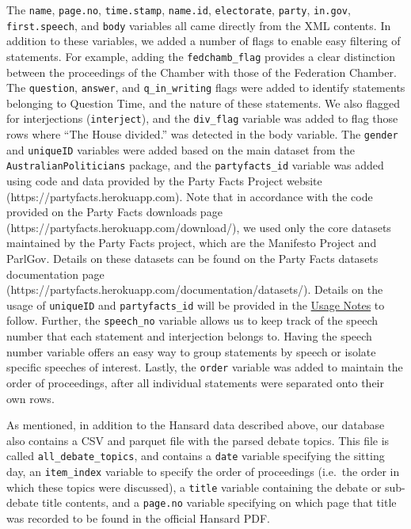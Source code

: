 \documentclass[
  letterpaper,
  DIV=11,
  numbers=noendperiod]{scrartcl}
\begin{document}
The \texttt{name}, \texttt{page.no}, \texttt{time.stamp},
\texttt{name.id}, \texttt{electorate}, \texttt{party}, \texttt{in.gov},
\texttt{first.speech}, and \texttt{body} variables all came directly
from the XML contents. In addition to these variables, we added a number
of flags to enable easy filtering of statements. For example, adding the
\texttt{fedchamb\_flag} provides a clear distinction between the
proceedings of the Chamber with those of the Federation Chamber. The
\texttt{question}, \texttt{answer}, and \texttt{q\_in\_writing} flags
were added to identify statements belonging to Question Time, and the
nature of these statements. We also flagged for interjections
(\texttt{interject}), and the \texttt{div\_flag} variable was added to
flag those rows where ``The House divided.'' was detected in the body
variable. The \texttt{gender} and \texttt{uniqueID} variables were added
based on the main dataset from the \texttt{AustralianPoliticians}
package, and the \texttt{partyfacts\_id} variable was added using code
and data provided by the Party Facts Project website
(https://partyfacts.herokuapp.com). Note that in accordance with the
code provided on the Party Facts downloads page
(https://partyfacts.herokuapp.com/download/), we used only the core
datasets maintained by the Party Facts project, which are the Manifesto
Project and ParlGov. Details on these datasets can be found on the Party
Facts datasets documentation page
(https://partyfacts.herokuapp.com/documentation/datasets/). Details on
the usage of \texttt{uniqueID} and \texttt{partyfacts\_id} will be
provided in the \protect\hyperlink{sec-usage}{Usage Notes} to follow.
Further, the \texttt{speech\_no} variable allows us to keep track of the
speech number that each statement and interjection belongs to. Having
the speech number variable offers an easy way to group statements by
speech or isolate specific speeches of interest. Lastly, the
\texttt{order} variable was added to maintain the order of proceedings,
after all individual statements were separated onto their own rows.

As mentioned, in addition to the Hansard data described above, our
database also contains a CSV and parquet file with the parsed debate
topics. This file is called \texttt{all\_debate\_topics}, and contains a
\texttt{date} variable specifying the sitting day, an
\texttt{item\_index} variable to specify the order of proceedings
(i.e.~the order in which these topics were discussed), a \texttt{title}
variable containing the debate or sub-debate title contents, and a
\texttt{page.no} variable specifying on which page that title was
recorded to be found in the official Hansard PDF.
\end{document}
